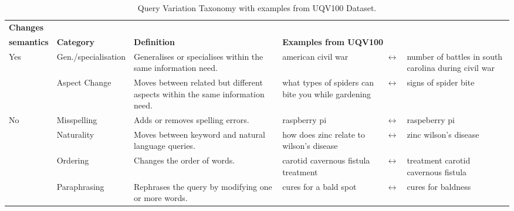 \begin{table}[h]
\centering
\caption{Query Variation Taxonomy with examples from UQV100 Dataset.}
\label{tab:var-types}
\begin{tabularx}{\columnwidth}{l|l|X|XcX}

\textbf{Changes}\\\textbf{semantics} & \textbf{Category} & \textbf{Definition} & \multicolumn{3}{l}{\textbf{Examples from UQV100}} \\ \hline
\multirow{2}{*}{Yes} & Gen./specialisation & Generalises or specialises within the same information need. & american civil war & $ \leftrightarrow $ & number of battles in south carolina during civil war \\ \cline{2-6} 
 & Aspect Change & Moves between related but different aspects within the same information need. & what types of spiders can bite you while gardening & $ \leftrightarrow $ & {signs of spider bite} \\ \hline
\multirow{4}{*}{No} & Misspelling & Adds or removes spelling errors. & raspberry pi & $ \leftrightarrow $ & raspeberry pi \\ \cline{2-6} 
 & Naturality & Moves between keyword and natural language queries. & how does zinc relate to wilson’s disease & $ \leftrightarrow $ & {zinc wilson’s disease} \\ \cline{2-6} 
 & Ordering & Changes the order of words. & carotid cavernous fistula treatment & $ \leftrightarrow $ & treatment carotid cavernous fistula \\ \cline{2-6} 
 & Paraphrasing & Rephrases the query by modifying one or more words. & cures for a bald spot & $ \leftrightarrow $ & cures for baldness \\ \hline
 
\end{tabularx}
\end{table}